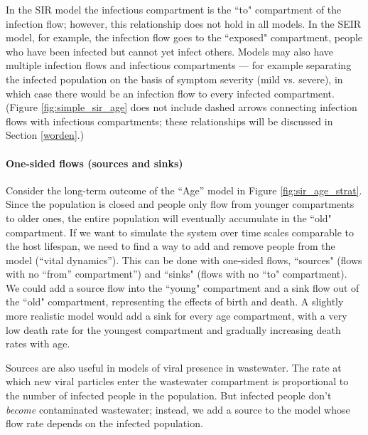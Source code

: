 In the SIR model the infectious compartment is the ``to" compartment of the infection flow; however, this relationship does not hold in all models.  In the SEIR model, for example, the infection flow goes to the ``exposed" compartment, people who have been infected but cannot yet infect others. Models may also have multiple infection flows and infectious compartments --- for example separating the infected population on the basis of symptom severity (mild vs. severe), in which case there would be an infection flow to every infected compartment. (Figure \ref{fig:simple_sir_age} does not include dashed arrows connecting infection flows with infectious compartments; these relationships will be discussed in Section \ref{worden}.)

\paragraph{One-sided flows (sources and sinks)}

Consider the long-term outcome of the ``Age'' model in Figure \ref{fig:sir_age_strat}. Since the population is closed and people only flow from younger compartments to older ones, the entire population will eventually accumulate in the ``old" compartment. If we want to simulate the system over time scales comparable to the host lifespan, we need to find a way to add and remove people from the model (``vital dynamics''). This can be done with one-sided flows, ``sources" (flows with no ``from'' compartment'') and ``sinks" (flows with no ``to" compartment). We could add a source flow into the ``young" compartment and a sink flow out of the ``old" compartment, representing the effects of birth and death. A slightly more realistic model would add a sink for every age compartment,  with a very low death rate for the youngest compartment and gradually increasing death rates with age.

Sources are also useful in models of viral presence in wastewater. The rate at which new viral particles enter the wastewater compartment is proportional to the number of infected people in the population. But infected people don't \emph{become} contaminated wastewater; instead, we add a source to the model whose flow rate depends on the infected population.

